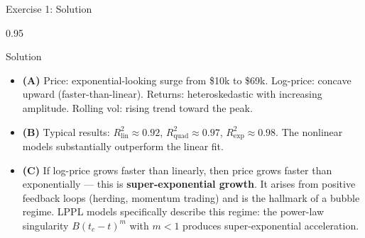 \documentclass[9pt, aspectratio=169, t]{beamer}
\begin{document}
\begin{frame}{Exercise 1: Solution}
    \begin{cminipage}{0.95\textwidth}
    \begin{exampleblock}{Solution}
        {\small
        \begin{itemize}\setlength{\itemsep}{3pt}
            \item \textcolor{MainBlue}{\textbf{(A)}} Price: exponential-looking surge from \$10k to \$69k. Log-price: concave upward (faster-than-linear). Returns: heteroskedastic with increasing amplitude. Rolling vol: rising trend toward the peak.
            \item \textcolor{MainBlue}{\textbf{(B)}} Typical results: $R^2_{\text{lin}} \approx 0.92$, $R^2_{\text{quad}} \approx 0.97$, $R^2_{\text{exp}} \approx 0.98$. The nonlinear models substantially outperform the linear fit.
            \item \textcolor{MainBlue}{\textbf{(C)}} If log-price grows faster than linearly, then price grows faster than exponentially --- this is \textbf{super-exponential growth}. It arises from positive feedback loops (herding, momentum trading) and is the hallmark of a bubble regime. LPPL models specifically describe this regime: the power-law singularity $B(t_c - t)^m$ with $m < 1$ produces super-exponential acceleration.
        \end{itemize}
        }
    \end{exampleblock}
    \end{cminipage}
\end{frame}
\end{document}
